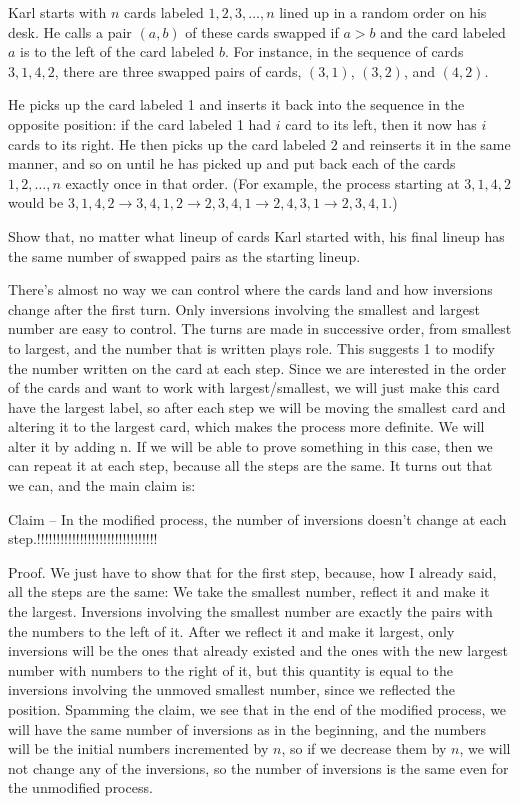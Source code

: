 \begin{example} [USAJMO 2018]
    Karl starts with $n$ cards labeled $1,2,3,\dots,n$ lined up in a random order on his desk. He calls a pair $(a,b)$ of these cards swapped if $a>b$ and the card labeled $a$ is to the left of the card labeled $b$. For instance, in the sequence of cards $3,1,4,2$, there are three swapped pairs of cards, $(3,1)$, $(3,2)$, and $(4,2)$.

    He picks up the card labeled 1 and inserts it back into the sequence in the opposite position: if the card labeled 1 had $i$ card to its left, then it now has $i$ cards to its right. He then picks up the card labeled $2$ and reinserts it in the same manner, and so on until he has picked up and put back each of the cards $1,2,\dots,n$ exactly once in that order. (For example, the process starting at $3,1,4,2$ would be $3,1,4,2\to 3,4,1,2\to 2,3,4,1\to 2,4,3,1\to 2,3,4,1$.)

    Show that, no matter what lineup of cards Karl started with, his final lineup has the same number of swapped pairs as the starting lineup.
\end{example}

There’s almost no way we can control where the cards land and how inversions change after the first turn. Only inversions involving the smallest and largest number are easy to control. The turns are made in successive order, from smallest to largest, and the number that is written plays role. This suggests 1 to modify the number written on the card at each step. Since we are interested in the order of the cards and want to work with largest/smallest, we will just make this card have the largest label, so after each step we will be moving the smallest card and altering it to the largest card, which makes the process more definite. We will alter it by adding n. If we will be able to prove something in this case, then we can repeat it at each step, because all the steps are the same. It turns out that we can, and the main claim is:

Claim -- In the modified process, the number of inversions doesn’t change at each step.!!!!!!!!!!!!!!!!!!!!!!!!!!!!!!!

Proof. We just have to show that for the first step, because, how I already said, all the steps are the same: We take the smallest number, reflect it and make it the largest. Inversions involving the smallest number are exactly the pairs with the numbers to the left of it. After we reflect it and make it largest, only inversions will be the ones that already existed and the ones with the new largest number with numbers to the right of it, but this quantity is equal to the inversions involving the unmoved smallest number, since we reflected the position. Spamming the claim, we see that in the end of the modified process, we will have the same number of inversions as in the beginning, and the numbers will be the initial numbers incremented by $n$, so if we decrease them by $n$, we will not change any of the inversions, so the number of inversions is the same even for the unmodified process.

